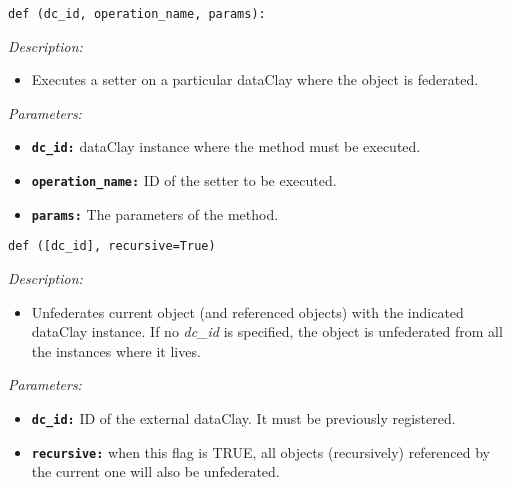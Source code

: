 
\begin{dBox}
\texttt{def (dc\_id, \newline operation\_name, params):}
\LINE

{\it Description:}

\begin{itemize}
  \item Executes a setter on a particular dataClay where the object is federated.
\end{itemize}

{\it Parameters:}

\begin{itemize}
  \item \texttt{\bfseries dc\_id:} dataClay instance where the method must be executed.
  \item \texttt{\bfseries operation\_name:} ID of the setter to be executed.
  \item \texttt{\bfseries params:} The parameters of the method.
\end{itemize}
 
\end{dBox}

\begin{dBox}

\texttt{def ([dc\_id], recursive=True)}
\LINE

{\it Description:}

\begin{itemize}
  \item Unfederates current object (and referenced objects) with the indicated dataClay instance. If no \textit{dc\_id} is specified, the object is unfederated from all the instances where it lives.
\end{itemize}

{\it Parameters:}

\begin{itemize}
  \item \texttt{\bfseries dc\_id:} ID of the external dataClay. It must be previously registered.
  \item \texttt{\bfseries recursive:} when this flag is TRUE, all objects (recursively) referenced by the current one will also be unfederated.
\end{itemize}

\end{dBox}







